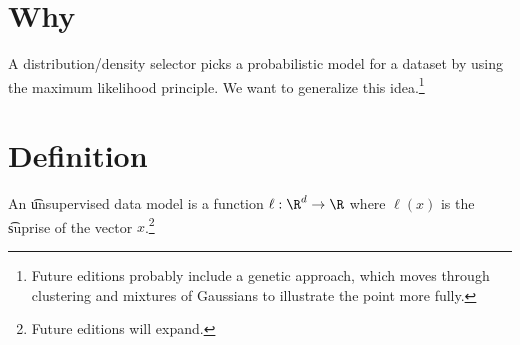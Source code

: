 
\section*{Why}

A distribution/density selector picks a probabilistic model for a dataset by using the maximum likelihood principle.
We want to generalize this idea.\footnote{Future editions probably include a genetic approach, which moves through clustering and mixtures of Gaussians to illustrate the point more fully.}

\section*{Definition}

An \t{unsupervised data model} is a function $\ell : \R ^d \to \R $ where $\ell (x)$ is the \t{suprise} of the vector $x$.\footnote{Future editions will expand.}

\blankpage